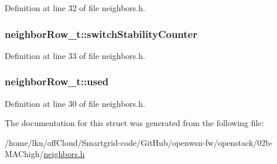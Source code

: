 Definition at line 32 of file neighbors.\+h.

\subsubsection[{\texorpdfstring{switch\+Stability\+Counter}{switchStabilityCounter}}]{ neighbor\+Row\+\_\+t\+::switch\+Stability\+Counter}\hypertarget{structneighbor_row__t_aaba53adc47888065ae6875f27b9b3f48}{}\label{structneighbor_row__t_aaba53adc47888065ae6875f27b9b3f48}


Definition at line 33 of file neighbors.\+h.

\subsubsection[{\texorpdfstring{used}{used}}]{ neighbor\+Row\+\_\+t\+::used}\hypertarget{structneighbor_row__t_a1803ce6d1b32a8f05590181c2aac294e}{}\label{structneighbor_row__t_a1803ce6d1b32a8f05590181c2aac294e}


Definition at line 30 of file neighbors.\+h.



The documentation for this struct was generated from the following file\+:\begin{DoxyCompactItemize}
\item 
/home/lkn/off\+Cloud/\+Smartgrid-\/code/\+Git\+Hub/openwsn-\/fw/openstack/02b-\/\+M\+A\+Chigh/\hyperlink{neighbors_8h}{neighbors.\+h}\end{DoxyCompactItemize}
